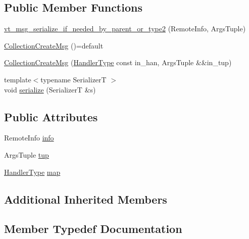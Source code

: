 \subsection*{Public Member Functions}
\begin{DoxyCompactItemize}
\item 
\hyperlink{structvt_1_1vrt_1_1collection_1_1_collection_create_msg_a38d80595f49a4e500caa032cd19ec94f}{vt\+\_\+msg\+\_\+serialize\+\_\+if\+\_\+needed\+\_\+by\+\_\+parent\+\_\+or\+\_\+type2} (Remote\+Info, Args\+Tuple)
\item 
\hyperlink{structvt_1_1vrt_1_1collection_1_1_collection_create_msg_a26a913507e16eabcb1949dc0f01d2b31}{Collection\+Create\+Msg} ()=default
\item 
\hyperlink{structvt_1_1vrt_1_1collection_1_1_collection_create_msg_af4efa669078a8896013e8da6e9beba51}{Collection\+Create\+Msg} (\hyperlink{namespacevt_af64846b57dfcaf104da3ef6967917573}{Handler\+Type} const in\+\_\+han, Args\+Tuple \&\&in\+\_\+tup)
\item 
{\footnotesize template$<$typename SerializerT $>$ }\\void \hyperlink{structvt_1_1vrt_1_1collection_1_1_collection_create_msg_a90036f40816bf04321ea62d03a455a47}{serialize} (SerializerT \&s)
\end{DoxyCompactItemize}
\subsection*{Public Attributes}
\begin{DoxyCompactItemize}
\item 
Remote\+Info \hyperlink{structvt_1_1vrt_1_1collection_1_1_collection_create_msg_a7c959b39f6f42a9e174d9658978cf93b}{info}
\item 
Args\+Tuple \hyperlink{structvt_1_1vrt_1_1collection_1_1_collection_create_msg_a5be3c55f9dd0d77e5d576541f204fc26}{tup}
\item 
\hyperlink{namespacevt_af64846b57dfcaf104da3ef6967917573}{Handler\+Type} \hyperlink{structvt_1_1vrt_1_1collection_1_1_collection_create_msg_a72c6c45b7caee61689cd45873d7ef876}{map}
\end{DoxyCompactItemize}
\subsection*{Additional Inherited Members}


\subsection{Member Typedef Documentation}
\mbox{\label{structvt_1_1vrt_1_1collection_1_1_collection_create_msg_abb55583fc386581742c169c93840744f}} 
